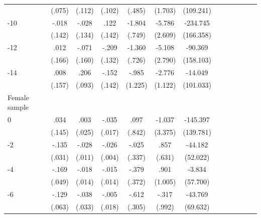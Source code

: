 \begin{table}[p]
\begin{adjustbox}{max width=\linewidth}
\begin{threeparttable}
{\begin{tabular}{l*{6}{S S}}
                &   (.075)         &   (.112)         &   (.102)         &   (.485)         &  (1.703)         &(109.241)         \\
-10            &    -.018         &    -.028         &     .122         &   -1.804\sym{**} &   -5.786\sym{**} & -234.745         \\
                &   (.142)         &   (.134)         &   (.142)         &   (.749)         &  (2.609)         &(166.358)         \\
-12           &     .012         &    -.071         &    -.209         &   -1.360\sym{*}  &   -5.108\sym{*}  &  -90.369         \\
                &   (.166)         &   (.160)         &   (.132)         &   (.726)         &  (2.790)         &(158.103)         \\
-14           &     .008         &     .206\sym{**} &    -.152         &    -.985         &   -2.776\sym{**} &  -14.049         \\
                &   (.157)         &   (.093)         &   (.142)         &  (1.225)         &  (1.122)         &(101.033)         \\
\midrule
Female sample &&&&&&\\
0               &     .034         &     .003         &    -.035\sym{**} &     .097         &   -1.037         & -145.397         \\
                &   (.145)         &   (.025)         &   (.017)         &   (.842)         &  (3.375)         &(139.781)         \\
-2             &    -.135\sym{***}&    -.028\sym{***}&    -.026\sym{***}&    -.025         &     .857         &  -44.182         \\
                &   (.031)         &   (.011)         &   (.004)         &   (.337)         &   (.631)         & (52.022)         \\
-4             &    -.169\sym{***}&    -.018         &    -.015         &    -.379         &     .901         &   -3.834         \\
                &   (.049)         &   (.014)         &   (.014)         &   (.372)         &  (1.005)         & (57.700)         \\
-6             &    -.129\sym{**} &    -.038         &    -.005         &    -.612\sym{**} &    -.317         &  -43.769         \\
                &   (.063)         &   (.033)         &   (.018)         &   (.305)         &   (.992)         & (69.632)         \\

\end{tabular}}
\end{threeparttable}
\end{adjustbox}
\end{table}
